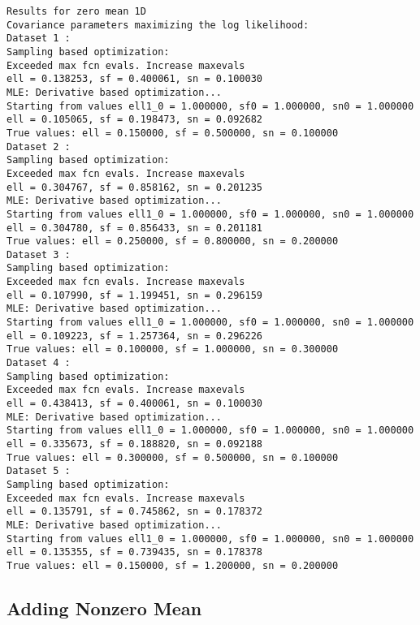         \color{lightgray} \begin{verbatim}Results for zero mean 1D
Covariance parameters maximizing the log likelihood:
Dataset 1 : 
Sampling based optimization:
Exceeded max fcn evals. Increase maxevals
ell = 0.138253, sf = 0.400061, sn = 0.100030 
MLE: Derivative based optimization...
Starting from values ell1_0 = 1.000000, sf0 = 1.000000, sn0 = 1.000000 
ell = 0.105065, sf = 0.198473, sn = 0.092682 
True values: ell = 0.150000, sf = 0.500000, sn = 0.100000 
Dataset 2 : 
Sampling based optimization:
Exceeded max fcn evals. Increase maxevals
ell = 0.304767, sf = 0.858162, sn = 0.201235 
MLE: Derivative based optimization...
Starting from values ell1_0 = 1.000000, sf0 = 1.000000, sn0 = 1.000000 
ell = 0.304780, sf = 0.856433, sn = 0.201181 
True values: ell = 0.250000, sf = 0.800000, sn = 0.200000 
Dataset 3 : 
Sampling based optimization:
Exceeded max fcn evals. Increase maxevals
ell = 0.107990, sf = 1.199451, sn = 0.296159 
MLE: Derivative based optimization...
Starting from values ell1_0 = 1.000000, sf0 = 1.000000, sn0 = 1.000000 
ell = 0.109223, sf = 1.257364, sn = 0.296226 
True values: ell = 0.100000, sf = 1.000000, sn = 0.300000 
Dataset 4 : 
Sampling based optimization:
Exceeded max fcn evals. Increase maxevals
ell = 0.438413, sf = 0.400061, sn = 0.100030 
MLE: Derivative based optimization...
Starting from values ell1_0 = 1.000000, sf0 = 1.000000, sn0 = 1.000000 
ell = 0.335673, sf = 0.188820, sn = 0.092188 
True values: ell = 0.300000, sf = 0.500000, sn = 0.100000 
Dataset 5 : 
Sampling based optimization:
Exceeded max fcn evals. Increase maxevals
ell = 0.135791, sf = 0.745862, sn = 0.178372 
MLE: Derivative based optimization...
Starting from values ell1_0 = 1.000000, sf0 = 1.000000, sn0 = 1.000000 
ell = 0.135355, sf = 0.739435, sn = 0.178378 
True values: ell = 0.150000, sf = 1.200000, sn = 0.200000 
\end{verbatim} \color{black}
    

\subsection*{Adding Nonzero Mean}

